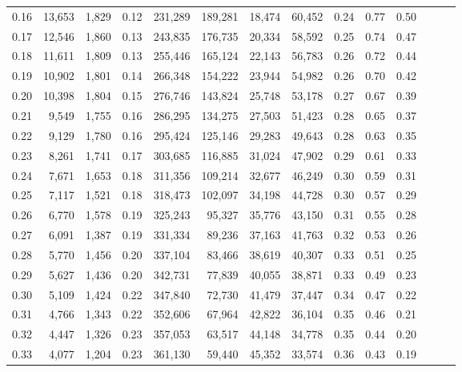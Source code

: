 \begin{tabular}{rrrrrrrrrrrrrr}
0.16 &  13,653 &  1,829 &  0.12 &  231,289 &  189,281 &  18,474 &  60,452 &  0.24 &  0.77 &      0.50 \\
0.17 &  12,546 &  1,860 &  0.13 &  243,835 &  176,735 &  20,334 &  58,592 &  0.25 &  0.74 &      0.47 \\
0.18 &  11,611 &  1,809 &  0.13 &  255,446 &  165,124 &  22,143 &  56,783 &  0.26 &  0.72 &      0.44 \\
0.19 &  10,902 &  1,801 &  0.14 &  266,348 &  154,222 &  23,944 &  54,982 &  0.26 &  0.70 &      0.42 \\
0.20 &  10,398 &  1,804 &  0.15 &  276,746 &  143,824 &  25,748 &  53,178 &  0.27 &  0.67 &      0.39 \\
0.21 &   9,549 &  1,755 &  0.16 &  286,295 &  134,275 &  27,503 &  51,423 &  0.28 &  0.65 &      0.37 \\
0.22 &   9,129 &  1,780 &  0.16 &  295,424 &  125,146 &  29,283 &  49,643 &  0.28 &  0.63 &      0.35 \\
0.23 &   8,261 &  1,741 &  0.17 &  303,685 &  116,885 &  31,024 &  47,902 &  0.29 &  0.61 &      0.33 \\
0.24 &   7,671 &  1,653 &  0.18 &  311,356 &  109,214 &  32,677 &  46,249 &  0.30 &  0.59 &      0.31 \\
0.25 &   7,117 &  1,521 &  0.18 &  318,473 &  102,097 &  34,198 &  44,728 &  0.30 &  0.57 &      0.29 \\
0.26 &   6,770 &  1,578 &  0.19 &  325,243 &   95,327 &  35,776 &  43,150 &  0.31 &  0.55 &      0.28 \\
0.27 &   6,091 &  1,387 &  0.19 &  331,334 &   89,236 &  37,163 &  41,763 &  0.32 &  0.53 &      0.26 \\
0.28 &   5,770 &  1,456 &  0.20 &  337,104 &   83,466 &  38,619 &  40,307 &  0.33 &  0.51 &      0.25 \\
0.29 &   5,627 &  1,436 &  0.20 &  342,731 &   77,839 &  40,055 &  38,871 &  0.33 &  0.49 &      0.23 \\
0.30 &   5,109 &  1,424 &  0.22 &  347,840 &   72,730 &  41,479 &  37,447 &  0.34 &  0.47 &      0.22 \\
0.31 &   4,766 &  1,343 &  0.22 &  352,606 &   67,964 &  42,822 &  36,104 &  0.35 &  0.46 &      0.21 \\
0.32 &   4,447 &  1,326 &  0.23 &  357,053 &   63,517 &  44,148 &  34,778 &  0.35 &  0.44 &      0.20 \\
0.33 &   4,077 &  1,204 &  0.23 &  361,130 &   59,440 &  45,352 &  33,574 &  0.36 &  0.43 &      0.19 \\

\end{tabular}

